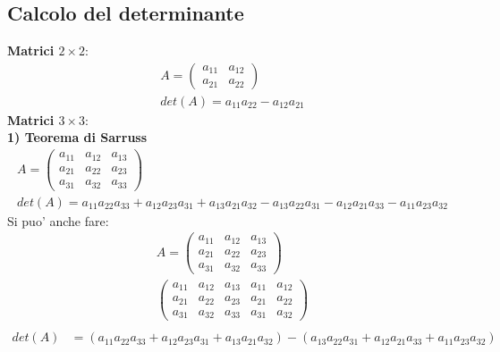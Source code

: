 \documentclass{article}
\begin{document}
\subsection{Calcolo del determinante}
\textbf{Matrici $2\times 2$}:
\begin{align*}
  A=\begin{pmatrix}  
    a_{11} & a_{12} \\
    a_{21} & a_{22}
  \end{pmatrix} \\
  det(A)=a_{11}a_{22}-a_{12}a_{21}
\end{align*}
\textbf{Matrici $3\times 3$}:
\textbf{\\1) Teorema di Sarruss}
\begin{align*}
  A=\begin{pmatrix}  
    a_{11} & a_{12} & a_{13} \\
    a_{21} & a_{22} & a_{23} \\
    a_{31} & a_{32} & a_{33}
  \end{pmatrix} \\
  det(A) = a_{11}a_{22}a_{33} + a_{12}a_{23}a_{31} + a_{13}a_{21}a_{32}  - a_{13}a_{22}a_{31} - a_{12}a_{21}a_{33} - a_{11}a_{23}a_{32}
\end{align*}
Si puo' anche fare:
\begin{align*}
  A=\begin{pmatrix}  
    a_{11} & a_{12} & a_{13} \\
    a_{21} & a_{22} & a_{23} \\
    a_{31} & a_{32} & a_{33}
  \end{pmatrix} \\
  \begin{pmatrix}  
    a_{11} & a_{12} & a_{13} & a_{11} & a_{12}\\
    a_{21} & a_{22} & a_{23} & a_{21} & a_{22}\\
    a_{31} & a_{32} & a_{33} &a_{31} & a_{32} 
  \end{pmatrix}  \\
\end{align*}
\begin{align*}
  det(A) &= (a_{11}a_{22}a_{33} + a_{12}a_{23}a_{31} + a_{13}a_{21}a_{32}) - (a_{13}a_{22}a_{31} + a_{12}a_{21}a_{33} + a_{11}a_{23}a_{32})
\end{align*}
\end{document}
